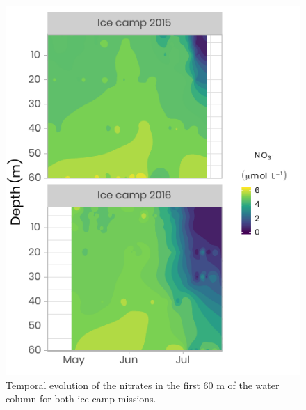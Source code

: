 \documentclass[12pt,a4paper]{scrartcl}
\begin{document}
\begin{figure}[h]
	\centering
	\includegraphics[scale = 1]{../../../graphs/fig08.pdf}
	\caption{Temporal evolution of the nitrates in the first 60 m of the water column for both ice camp missions.}
\end{figure}

\clearpage
\newpage
\end{document}
